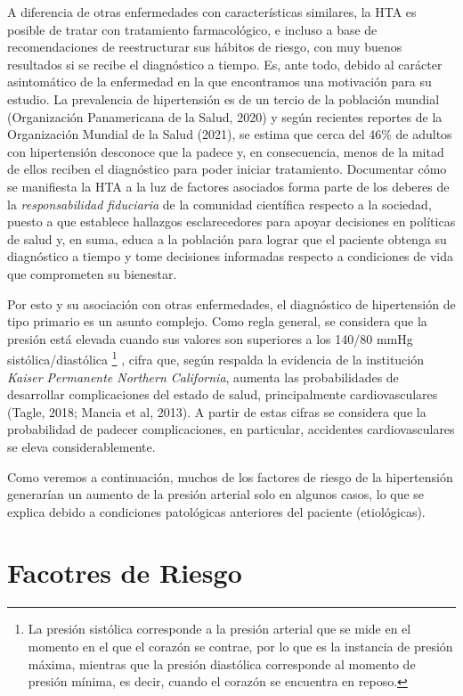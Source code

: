 \documentclass{aa}
\newcounter{daggerfootnote}
\newcommand*{\daggerfootnote}[1]{%
    \setcounter{daggerfootnote}{\value{footnote}}%
    \renewcommand*{\thefootnote}{\fnsymbol{footnote}}%
    \footnote[2]{#1}%
    \setcounter{footnote}{\value{daggerfootnote}}%
    \renewcommand*{\thefootnote}{\arabic{footnote}}%
    }
\begin{document}
A diferencia de otras enfermedades con características similares, la HTA es posible de tratar con tratamiento farmacológico, e incluso a base de recomendaciones de reestructurar sus hábitos de riesgo, con muy buenos resultados si se recibe el diagnóstico a tiempo. Es, ante todo, debido al carácter asintomático de la enfermedad en la que encontramos una motivación para su estudio. La prevalencia de hipertensión es de un tercio de la población mundial (Organización Panamericana de la Salud, 2020) y según recientes reportes de la Organización Mundial de la Salud (2021), se estima que cerca del 46\% de adultos con hipertensión desconoce que la padece y, en consecuencia, menos de la mitad de ellos reciben el diagnóstico para poder iniciar tratamiento. Documentar  cómo se manifiesta la HTA a la luz de factores asociados forma parte de los deberes de la \textit{responsabilidad fiduciaria} de la comunidad científica respecto a la sociedad, puesto a que establece hallazgos esclarecedores para apoyar decisiones en políticas de salud y, en suma, educa a la población para lograr que el paciente obtenga su diagnóstico a tiempo y tome decisiones informadas respecto a condiciones de vida que comprometen su bienestar.

Por esto y su asociación con otras enfermedades, el diagnóstico de hipertensión de tipo primario es un asunto complejo. Como regla general, se considera que la presión está elevada cuando sus valores son superiores a los 140/80 mmHg sistólica/diastólica\daggerfootnote{La presión sistólica corresponde a la presión arterial que se mide en el momento en el que el corazón se contrae, por lo que es la instancia de presión máxima, mientras que la presión diastólica corresponde al momento de presión mínima, es decir, cuando el corazón se encuentra en reposo.}, cifra que, según respalda la evidencia de la institución \textit{Kaiser Permanente Northern California}, aumenta las probabilidades de desarrollar complicaciones del estado de salud, principalmente cardiovasculares (Tagle, 2018; Mancia et al, 2013). A partir de estas cifras se considera que la probabilidad de padecer complicaciones, en particular, accidentes cardiovasculares se eleva considerablemente.

Como veremos a continuación, muchos de los factores de riesgo de la hipertensión generarían un aumento de la presión arterial solo en algunos casos, lo que se explica debido a condiciones patológicas anteriores del paciente (etiológicas).

\section{Facotres de Riesgo}
\end{document}
